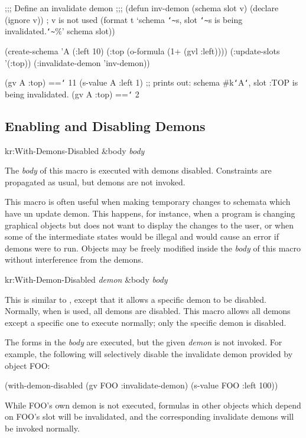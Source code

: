 \begin{programexample}
;;; Define an invalidate demon
;;;
(defun inv-demon (schema slot v)
  (declare (ignore v))     ; v is not used
  (format t
	  `schema {\tt\char`\~}s, slot {\tt\char`\~}s is being invalidated.{\tt\char`\~}\%'
	  schema slot))

(create-schema 'A (:left 10)
  (:top (o-formula (1+ (gvl :left))))
  (:update-slots '(:top))
  (:invalidate-demon 'inv-demon))

(gv A :top)  =={\tt\char`\>} 11
(s-value A :left 1)
;; prints out:
schema \#k{\tt\char`\<}A{\tt\char`\>}, slot :TOP is being invalidated.
(gv A :top)  =={\tt\char`\>} 2
\end{programexample}


\subsection{Enabling and Disabling Demons}

\value{f-top}
\begin{example}
kr:With-Demons-Disabled \&body {\it body}\value{macro}
\end{example}

The {\it body} of this macro is executed with demons disabled.  Constraints are
propagated as usual, but demons are not invoked.

This macro is often useful when making temporary changes to schemata which have un update demon.  This happens,
for instance, when a program is changing graphical objects but does
not want to display the changes to the user, or when some of the
intermediate states would be illegal and would cause an error if
demons were to run.  Objects may be freely modified inside the
{\it body} of this macro without interference from the demons.


\value{f-top}
\begin{example}
kr:With-Demon-Disabled {\it demon} \&body {\it body}\value{macro}
\end{example}

This is similar to , except that it allows a
specific demon to be disabled.  Normally, when
 is used, all demons are disabled.  This
macro allows all demons except a specific one to execute normally;
only the specific demon is disabled.

The forms in the {\it body} are executed, but the
given {\it demon} is not invoked.  For example, the following will
selectively disable the invalidate demon provided by object FOO:
\begin{programexample}
(with-demon-disabled (gv FOO :invalidate-demon)
  (s-value FOO :left 100))
\end{programexample}
While FOO's own demon is not
executed, formulas in other objects which depend on FOO's
 slot will be invalidated, and the corresponding invalidate
demons will be invoked normally.



